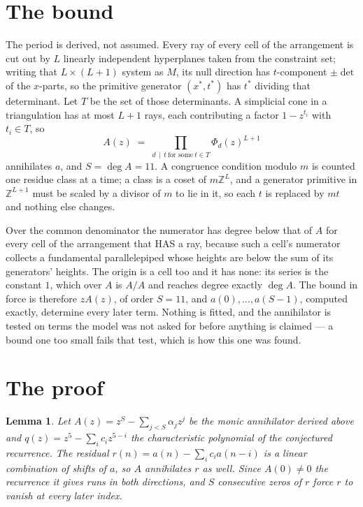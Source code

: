 \documentclass[11pt,a4paper]{article}
\theoremstyle{plain}
\newtheorem{lemma}[theorem]{Lemma}
\theoremstyle{definition}
\begin{document}
\section{The bound}

The period is derived, not assumed. Every ray of every cell of the arrangement is cut out by
$L$ linearly independent hyperplanes taken from the constraint set; writing that $L\times(L+1)$
system as $M$, its null direction has $t$-component $\pm\det$ of the $x$-parts, so the
primitive generator $(x^*,t^*)$ has $t^*$ dividing that determinant. Let $T$ be the set of
those determinants. A simplicial cone in a triangulation has at most $L+1$ rays, each
contributing a factor $1-z^{t_i}$ with $t_i\in T$, so
\[
A(z)\;=\;\prod_{d\,\mid\,t\ \text{for some}\ t\in T}\Phi_d(z)^{L+1}
\]
annihilates $a$, and $S=\deg A=11$. A congruence condition modulo $m$ is counted one residue
class at a time; a class is a coset of $m\mathbb{Z}^L$, and a generator primitive in
$\mathbb{Z}^{L+1}$ must be scaled by a divisor of $m$ to lie in it, so each $t$ is replaced
by $mt$ and nothing else changes.

Over the common denominator the numerator has degree below that of $A$ for every cell of the
arrangement that HAS a ray, because such a cell's numerator collects a fundamental
parallelepiped whose heights are below the sum of its generators' heights. The origin is a cell
too and it has none: its series is the constant $1$, which over $A$ is $A/A$ and reaches degree
exactly $\deg A$. The bound in force is therefore $zA(z)$, of order $S=11$, and
$a(0),\dots,a(S-1)$, computed exactly, determine every later term. Nothing is fitted, and the
annihilator is tested on terms the model was not asked for before anything is claimed --- a
bound one too small fails that test, which is how this one was found.

\section{The proof}

\begin{lemma}\label{lem:crit}
Let $A(z)=z^S-\sum_{j<S}\alpha_jz^{j}$ be the monic annihilator derived above and
$q(z)=z^{5}-\sum_ic_iz^{5-i}$ the characteristic polynomial of the conjectured
recurrence. The residual $r(n)=a(n)-\sum_ic_ia(n-i)$ is a linear combination of shifts of $a$,
so $A$ annihilates $r$ as well. Since $A(0)\ne0$ the recurrence it gives runs in both
directions, and $S$ consecutive zeros of $r$ force $r$ to vanish at every later index.
\end{lemma}
\end{document}
